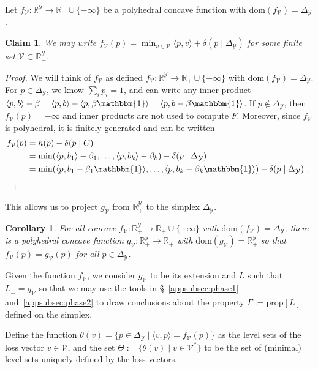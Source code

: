 \documentclass[11pt]{article}
\newcommand{\Comments}{1}
\newcommand{\mynote}[2]{\ifnum\Comments=1\textcolor{#1}{#2}\fi}
\newcommand{\raf}[1]{\mynote{darkgreen}{[RF: #1]}}
\newcommand{\reals}{\mathbb{R}}
\newcommand{\dom}{\mathrm{dom}}
\newcommand{\prop}[1]{\mathrm{prop}[#1]}
\newcommand{\simplex}{\Delta_\Y}
\newcommand{\V}{\mathcal{V}}
\newcommand{\Y}{\mathcal{Y}}
\newcommand{\risk}[1]{\underline{#1}}
\newcommand{\inprod}[2]{\langle #1, #2 \rangle}%
\newcommand{\ones}{\mathbbm{1}}
\newtheorem{corollary}{Corollary}
\newtheorem{claim}{Claim}
\begin{document}
Let $f_\V:\reals^\Y\to\reals_+\cup\{-\infty\}$ be a polyhedral concave function with $\dom(f_\V) = \simplex$.
\begin{claim}
	We may write $f_\V(p) = \min_{v\in\V} \inprod{p}{v} + \delta(p \mid \simplex)$ for some finite set $\V \subset \reals^\Y_+$. %
\end{claim}
\begin{proof}
  We will think of $f_\V$ as defined $f_\V:\reals^\Y\to\reals_+\cup\{-\infty\}$  with $\dom(f_\V) = \simplex$.
  For $p \in \simplex$, we know $\sum_i p_i = 1$, and can write any inner product $\inprod{p}{b} - \beta = \inprod{p}{b} - \inprod{p}{\beta \ones} = \inprod{p}{b - \beta \ones}$.
  If $p \not \in \simplex$, then $f_\V(p) = -\infty$ and inner products are not used to compute $F$.
  Moreover, since $f_\V$ is polyhedral, it is finitely generated \citep[Proposition 19.1.2]{rockafellar1997convex} and can be written 
	\begin{align*}
	f_\V(p) &= h(p) - \delta(p \mid C)\\
		 &= \min(\inprod{p}{b_1} - \beta_1, \ldots, \inprod{p}{b_k} - \beta_k) - \delta(p \mid \simplex)\\
		 &= \min(\inprod{p}{b_1 - \beta_1 \ones}, \ldots, \inprod{p}{b_k - \beta_k \ones}) - \delta(p \mid \simplex)~.~
	\end{align*}
\end{proof}
This allows us to project $g_\V$ from $\reals^\Y_+$ to the simplex $\simplex$.
\begin{corollary}\label{cor:f-matches-g-on-simplex}
  For all concave $f_\V : \reals^\Y_+ \to \reals_+ \cup \{-\infty\}$ with $\dom(f_\V) = \simplex$, there is a polyhedral concave function $g_\V : \reals^\Y_+ \to \reals_+$ with $\dom(g_\V) = \reals^\Y_+$ so that $f_\V(p) = g_\V(p)$ for all $p \in \simplex$.
\end{corollary}
Given the function $f_\V$, we consider $g_\V$ to be its extension and $L$ such that $\risk L_+ = g_\V$ so that we may use the tools in \S~\ref{appsubsec:phase1} and~\ref{appsubsec:phase2} to draw conclusions about the property $\Gamma := \prop{L}$ defined on the simplex.

Define the function $\theta(v) = \{p \in \simplex \mid \inprod{v}{p} = f_\V(p)\}$ as the level sets of the loss vector $v \in \V$, and the set $\Theta := \{\theta(v) \mid v \in \V^*\}$ to be the set of (minimal) level sets uniquely defined by the loss vectors.
\end{document}

